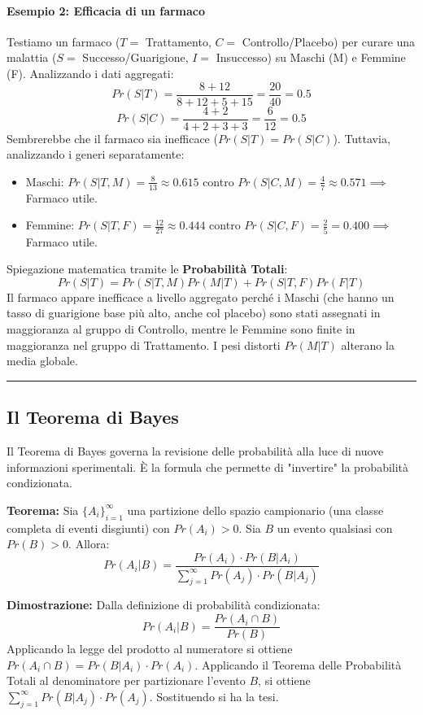 \documentclass[12pt, a4paper]{article}
\begin{document}
\paragraph{Esempio 2: Efficacia di un farmaco}
Testiamo un farmaco ($T=$ Trattamento, $C=$ Controllo/Placebo) per curare una malattia ($S=$ Successo/Guarigione, $I=$ Insuccesso) su Maschi (M) e Femmine (F).
Analizzando i dati aggregati:
$$ Pr(S|T) = \frac{8+12}{8+12+5+15} = \frac{20}{40} = 0.5 $$
$$ Pr(S|C) = \frac{4+2}{4+2+3+3} = \frac{6}{12} = 0.5 $$
Sembrerebbe che il farmaco sia inefficace ($Pr(S|T) = Pr(S|C)$). Tuttavia, analizzando i generi separatamente:
\begin{itemize}
    \item Maschi: $Pr(S|T, M) = \frac{8}{13} \approx 0.615$ contro $Pr(S|C, M) = \frac{4}{7} \approx 0.571 \implies$ Farmaco utile.
    \item Femmine: $Pr(S|T, F) = \frac{12}{27} \approx 0.444$ contro $Pr(S|C, F) = \frac{2}{5} = 0.400 \implies$ Farmaco utile.
\end{itemize}
Spiegazione matematica tramite le \textbf{Probabilità Totali}:
$$ Pr(S|T) = Pr(S|T,M)Pr(M|T) + Pr(S|T,F)Pr(F|T) $$
Il farmaco appare inefficace a livello aggregato perché i Maschi (che hanno un tasso di guarigione base più alto, anche col placebo) sono stati assegnati in maggioranza al gruppo di Controllo, mentre le Femmine sono finite in maggioranza nel gruppo di Trattamento. I pesi distorti $Pr(M|T)$ alterano la media globale.

\vspace{0.5cm}\hrule\vspace{0.5cm}

\subsection{Il Teorema di Bayes}
Il Teorema di Bayes governa la revisione delle probabilità alla luce di nuove informazioni sperimentali. È la formula che permette di "invertire" la probabilità condizionata.

\textbf{Teorema:} Sia $\{A_i\}_{i=1}^{\infty}$ una partizione dello spazio campionario (una classe completa di eventi disgiunti) con $Pr(A_i) > 0$. Sia $B$ un evento qualsiasi con $Pr(B) > 0$. Allora:
$$ Pr(A_i | B) = \frac{Pr(A_i) \cdot Pr(B | A_i)}{\sum_{j=1}^{\infty} Pr(A_j) \cdot Pr(B | A_j)} $$

\textbf{Dimostrazione:}
Dalla definizione di probabilità condizionata:
$$ Pr(A_i | B) = \frac{Pr(A_i \cap B)}{Pr(B)} $$
Applicando la legge del prodotto al numeratore si ottiene $Pr(A_i \cap B) = Pr(B | A_i) \cdot Pr(A_i)$. Applicando il Teorema delle Probabilità Totali al denominatore per partizionare l'evento $B$, si ottiene $\sum_{j=1}^{\infty} Pr(B | A_j) \cdot Pr(A_j)$. Sostituendo si ha la tesi.
\end{document}
